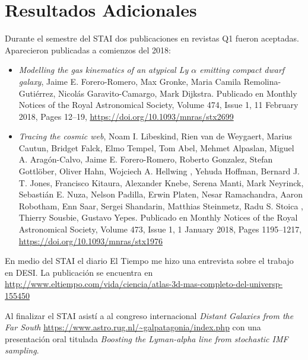 \documentclass[12pt,spanish]{article}
\begin{document}
\section*{Resultados Adicionales}

Durante el semestre del STAI dos publicaciones en revistas Q1 fueron aceptadas. Aparecieron
  publicadas a comienzos del 2018:

\begin{itemize}
\item{{\it Modelling the gas kinematics of an atypical Ly $\alpha$ emitting
    compact dwarf galaxy}, Jaime E. Forero-Romero,  Max Gronke,  Maria
  Camila Remolina-Gutiérrez, Nicolás Garavito-Camargo,  Mark Dijkstra.
  Publicado en Monthly Notices of the Royal Astronomical Society,
  Volume 474, Issue 1, 11 February 2018, Pages 12–19,
  \url{https://doi.org/10.1093/mnras/stx2699}} 
\item{{\it Tracing the cosmic web}, Noam I. Libeskind,  Rien van de
  Weygaert,  Marius Cautun,  Bridget Falck, Elmo Tempel,  Tom Abel,  Mehmet
  Alpaslan,  Miguel A. Aragón-Calvo, Jaime E. Forero-Romero,  Roberto
  Gonzalez,  Stefan Gottlöber,  Oliver Hahn, Wojciech A. Hellwing , Yehuda
  Hoffman,  Bernard J. T. Jones,  Francisco Kitaura, Alexander Knebe,
  Serena Manti,  Mark Neyrinck,  Sebastián E. Nuza, Nelson Padilla,  Erwin
  Platen,  Nesar Ramachandra,  Aaron Robotham,  Enn Saar, Sergei Shandarin,
  Matthias Steinmetz,  Radu S. Stoica , Thierry Sousbie, Gustavo Yepes. 
Publicado en Monthly Notices of the Royal Astronomical Society, Volume
473, Issue 1, 1 January 2018, Pages 1195–1217,
\url{https://doi.org/10.1093/mnras/stx1976}}
\end{itemize}

En medio del STAI el diario El Tiempo me hizo una entrevista sobre el
trabajo en DESI. La publicaci\'on se encuentra en \url{http://www.eltiempo.com/vida/ciencia/atlas-3d-mas-completo-del-universp-155450}

Al finalizar el STAI asist\'i a al congreso internacional
\emph{Distant Galaxies from the Far South}
\url{https://www.astro.rug.nl/~galpatagonia/index.php} con una
presentaci\'on oral titulada \emph{Boosting the Lyman-alpha
line from stochastic IMF sampling}.
\end{document}
